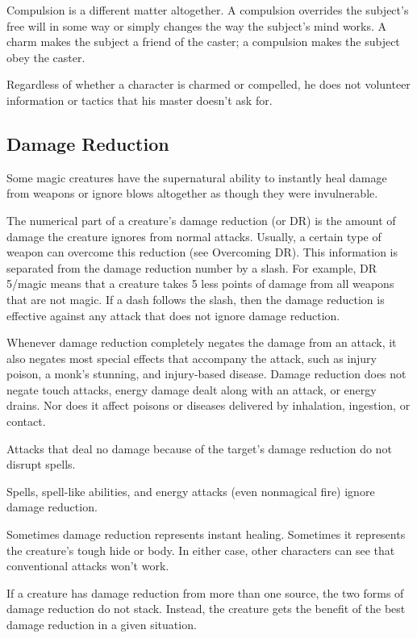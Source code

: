 Compulsion is a different matter altogether. A compulsion overrides the subject's free will in some way or simply changes the way the subject's mind works. A charm makes the subject a friend of the caster; a compulsion makes the subject obey the caster.
				
Regardless of whether a character is charmed or compelled, he does not volunteer information or tactics that his master doesn't ask for.
				
\subsection{Damage Reduction}

				
Some magic creatures have the supernatural ability to instantly heal damage from weapons or ignore blows altogether as though they were invulnerable.
				
The numerical part of a creature's damage reduction (or DR) is the amount of damage the creature ignores from normal attacks. Usually, a certain type of weapon can overcome this reduction (see Overcoming DR). This information is separated from the damage reduction number by a slash. For example, DR 5/magic means that a creature takes 5 less points of damage from all weapons that are not magic. If a dash follows the slash, then the damage reduction is effective against any attack that does not ignore damage reduction.
				
Whenever damage reduction completely negates the damage from an attack, it also negates most special effects that accompany the attack, such as injury poison, a monk's stunning, and injury-based disease. Damage reduction does not negate touch attacks, energy damage dealt along with an attack, or energy drains. Nor does it affect poisons or diseases delivered by inhalation, ingestion, or contact. 
				
Attacks that deal no damage because of the target's damage reduction do not disrupt spells.
				
Spells, spell-like abilities, and energy attacks (even nonmagical fire) ignore damage reduction.
				
Sometimes damage reduction represents instant healing. Sometimes it represents the creature's tough hide or body. In either case, other characters can see that conventional attacks won't work.
				
If a creature has damage reduction from more than one source, the two forms of damage reduction do not stack. Instead, the creature gets the benefit of the best damage reduction in a given situation. 
				
